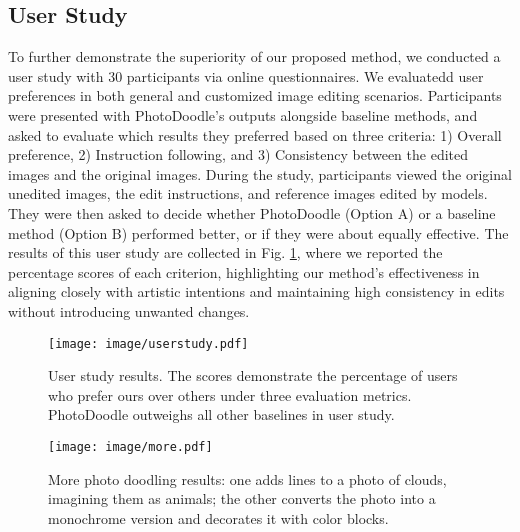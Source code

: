 
\subsection{User Study}

To further demonstrate the superiority of our proposed method, we conducted a user study with 30 participants via online questionnaires. We evaluatedd user preferences in both general and customized image editing scenarios. Participants were presented with PhotoDoodle's outputs alongside baseline methods, and asked to evaluate which results they preferred based on three criteria: 1) Overall preference, 2) Instruction following, and 3) Consistency between the edited images and the original images. During the study, participants viewed the original unedited images, the edit instructions, and reference images edited by models. They were then asked to decide whether PhotoDoodle (Option A) or a baseline method (Option B) performed better, or if they were about equally effective. The results of this user study are collected in Fig. \ref{fig6}, where we reported the percentage scores of each criterion, highlighting our method’s effectiveness in aligning closely with artistic intentions and maintaining high consistency in edits without introducing unwanted changes.

\begin{figure}[ht]
    \centering
    \texttt{[image: image/userstudy.pdf]} %

    \caption{User study results. The scores demonstrate the percentage of users who prefer ours over others under three evaluation metrics. PhotoDoodle outweighs all other baselines in user study.}

    \label{fig6}
    
\end{figure}

\begin{figure}[ht]
    \centering
    \texttt{[image: image/more.pdf]} %

    \caption{More photo doodling results: one adds lines to a photo of clouds, imagining them as animals; the other converts the photo into a monochrome version and decorates it with color blocks.}

    \label{fig7}
\end{figure}

